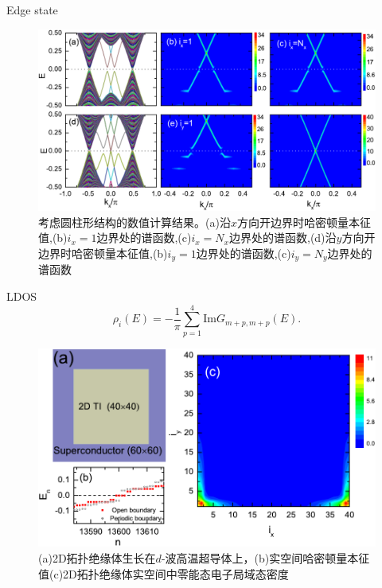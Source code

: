 \documentclass[10pt,aspectratio=169]{beamer} %
\begin{document}
\begin{frame}{Edge state}
\begin{figure}[h]
	\centering
	\includegraphics[scale=0.5]{pic/fig18.pdf}
	\caption{考虑圆柱形结构的数值计算结果。(a)沿$x$方向开边界时哈密顿量本征值,(b)$i_x=1$边界处的谱函数,(c)$i_x=N_x$边界处的谱函数,(d)沿$y$方向开边界时哈密顿量本征值,(b)$i_y=1$边界处的谱函数,(c)$i_y=N_y$边界处的谱函数}\label{fig17}
\end{figure}
\end{frame}
\begin{frame}{LDOS}
\begin{equation}
\rho_i(E)=-\frac{1}{\pi}\sum^4_{p=1}\mathrm{Im} G_{m+p,m+p}(E).
\end{equation}
\begin{figure}[h]
\centering
\includegraphics[scale=0.5]{pic/fig19}
\caption{(a)2D拓扑绝缘体生长在$d$-波高温超导体上，(b)实空间哈密顿量本征值(c)2D拓扑绝缘体实空间中零能态电子局域态密度}\label{fig18}
\end{figure}
\end{frame}
\end{document}
